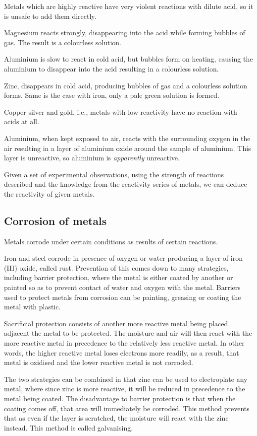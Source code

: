 Metals which are highly reactive have very violent reactions with dilute acid, so it is unsafe to
add them directly. 

Magnesium reacts strongly, disappearing into the acid while forming bubbles of
gas. The result is a colourless solution.

Aluminium is slow to react in cold acid, but bubbles form on heating, causing the aluminium to
disappear into the acid resulting in a colourless solution.

Zinc, disappears in cold acid, producing bubbles of gas and a colourless solution forms. Same is
the case with iron, only a pale green solution is formed.

Copper silver and gold, i.e., metals with low reactivity have no reaction with acids at all.

Aluminium, when kept exposed to air, reacts with the surrounding oxygen in the air resulting in
a layer of aluminium oxide around the sample of aluminium. This layer is unreactive, so aluminium
is \textit{apparently} unreactive.

Given a set of experimental observations, using the strength of reactions described and the 
knowledge from the reactivity series of metals, we can deduce the reactivity of given metals.

\subsection{Corrosion of metals}
Metals corrode under certain conditions as results of certain reactions.

Iron and steel corrode in presence of oxygen or water producing a layer of iron (III) oxide, called
rust. Prevention of this comes down to many strategies, including barrier protection, where the
metal is either coated by another or painted so as to prevent contact of water and oxygen with the
metal. Barriers used to protect metals from corrosion can be painting, greasing or coating the
metal with plastic.

Sacrificial protection consists of another more reactive metal being placed adjacent the metal
to be protected. The moisture and air will then react with the more reactive metal in precedence to
the relatively less reactive metal. In other words, the higher reactive metal loses electrons more
readily, as a result, that metal is oxidised and the lower reactive metal is not corroded.

The two strategies can be combined in that zinc can be used to electroplate any metal, where since
zinc is more reactive, it will be reduced in precedence to the metal being coated. The disadvantage
to barrier protection is that when the coating comes off, that area will immediately be corroded.
This method prevents that as even if the layer is scratched, the moisture will react with the zinc
instead. This method is called galvanising.

